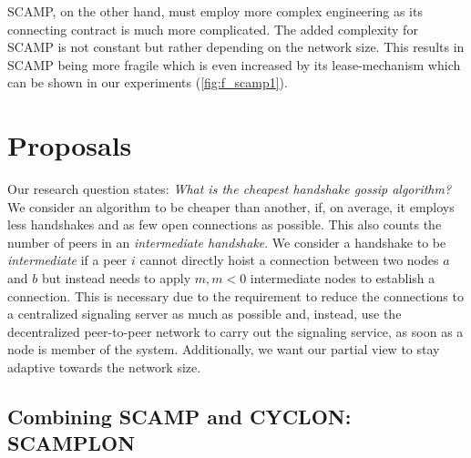 \documentclass[11pt, english, screen]{report-rd-info}
\begin{document}
SCAMP, on the other hand, must employ more complex engineering as its connecting contract is much more complicated.
The added complexity for SCAMP is not constant but rather depending on the network size.
This results in SCAMP being more fragile which is even increased by its lease-mechanism which can be shown in our experiments (\ref{fig:f_scamp1}).






\chapter{Proposals}
\label{chap:Proposals}

Our research question states: \emph{What is the cheapest handshake gossip algorithm?}
We consider an algorithm to be cheaper than another, if, on average, it employs less handshakes and as few open connections as possible.
This also counts the number of peers in an \emph{intermediate handshake}.
We consider a handshake to be \emph{intermediate} if a peer $i$ cannot directly hoist a connection between two nodes $a$ and $b$ but instead needs to apply $m, m < 0$ intermediate nodes to establish a connection.
This is necessary due to the requirement to reduce the connections to a centralized signaling server as much as possible and, instead, use the decentralized peer-to-peer network to carry out the signaling service, as soon as a node is member of the system.
Additionally, we want our partial view to stay adaptive towards the network size.

\section{Combining SCAMP and CYCLON: SCAMPLON}
\end{document}
